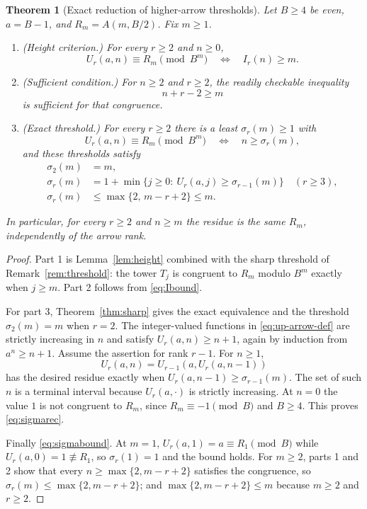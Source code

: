 \documentclass[11pt,letterpaper]{article}
\numberwithin{equation}{section}
\newtheorem{theorem}{Theorem}[section]
\theoremstyle{definition}
\theoremstyle{remark}
\begin{document}
\begin{theorem}[Exact reduction of higher-arrow thresholds]\label{thm:arrows}
Let $B\ge4$ be even, $a=B-1$, and $R_m=A(m,B/2)$. Fix $m\ge1$.
\begin{enumerate}[leftmargin=7mm,itemsep=2pt]
\item\emph{(Height criterion.)} For every $r\ge2$ and $n\ge0$,
\begin{equation}\label{eq:arrowiff}
 U_r(a,n)\equiv R_m\pmod{B^m}
 \quad\Longleftrightarrow\quad
 I_r(n)\ge m.
\end{equation}
\item\emph{(Sufficient condition.)} For $n\ge2$ and $r\ge2$, the readily checkable inequality
\begin{equation}\label{eq:arrowsufficient}
 n+r-2\ge m
\end{equation}
is sufficient for that congruence.
\item\emph{(Exact threshold.)} For every $r\ge2$ there is a least $\sigma_r(m)\ge1$ with
\[
 U_r(a,n)\equiv R_m\pmod{B^m}\quad\Longleftrightarrow\quad n\ge\sigma_r(m),
\]
and these thresholds satisfy
\begin{align}
 \sigma_2(m)&=m,\label{eq:sigma2}\\
 \sigma_r(m)&=1+\min\{j\ge0:\ U_r(a,j)\ge\sigma_{r-1}(m)\}
 \quad(r\ge3),\label{eq:sigmarec}\\
 \sigma_r(m)&\le\max\{2,\,m-r+2\}\le m .\label{eq:sigmabound}
\end{align}
\end{enumerate}
In particular, for every $r\ge2$ and $n\ge m$ the residue is the same $R_m$, independently of the arrow rank.
\end{theorem}
\begin{proof}
Part 1 is Lemma~\ref{lem:height} combined with the sharp threshold of Remark~\ref{rem:threshold}: the tower $T_j$ is congruent to $R_m$ modulo $B^m$ exactly when $j\ge m$. Part 2 follows from \eqref{eq:Ibound}.

For part 3, Theorem~\ref{thm:sharp} gives the exact equivalence and the threshold $\sigma_2(m)=m$ when $r=2$. The integer-valued functions in \eqref{eq:up-arrow-def} are strictly increasing in $n$ and satisfy $U_r(a,n)\ge n+1$, again by induction from $a^n\ge n+1$. Assume the assertion for rank $r-1$. For $n\ge1$,
\[
 U_r(a,n)=U_{r-1}(a,U_r(a,n-1))
\]
has the desired residue exactly when $U_r(a,n-1)\ge\sigma_{r-1}(m)$. The set of such $n$ is a terminal interval because $U_r(a,\cdot)$ is strictly increasing. At $n=0$ the value $1$ is not congruent to $R_m$, since $R_m\equiv-1\pmod B$ and $B\ge4$. This proves \eqref{eq:sigmarec}.

Finally \eqref{eq:sigmabound}. At $m=1$, $U_r(a,1)=a\equiv R_1\pmod B$ while $U_r(a,0)=1\not\equiv R_1$, so $\sigma_r(1)=1$ and the bound holds. For $m\ge2$, parts 1 and 2 show that every $n\ge\max\{2,m-r+2\}$ satisfies the congruence, so $\sigma_r(m)\le\max\{2,m-r+2\}$; and $\max\{2,m-r+2\}\le m$ because $m\ge2$ and $r\ge2$.
\end{proof}
\end{document}
